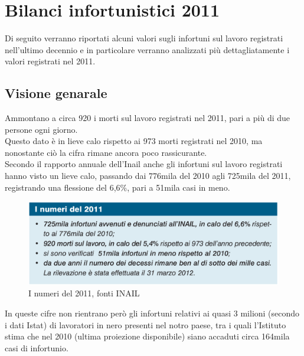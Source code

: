 
\section{Bilanci infortunistici 2011}
Di seguito verranno riportati alcuni valori sugli infortuni sul lavoro registrati nell'ultimo decennio e in particolare verranno analizzati più dettagliatamente i valori registrati nel 2011.

\subsection{Visione genarale}


Ammontano a circa 920 i morti sul lavoro registrati nel 2011, pari a più di due persone ogni giorno.\\
Questo dato è in lieve calo rispetto ai 973 morti registrati nel 2010, ma nonostante ciò la cifra rimane ancora poco rassicurante.\\
Secondo il rapporto annuale dell'Inail anche gli infortuni sul lavoro registrati hanno visto un lieve calo, passando dai 776mila del 2010 agli 725mila del 2011, registrando una flessione del 6,6\%, pari a 51mila casi in meno.\\

\begin{figure}[H]
\centering
\includegraphics[scale=0.3]{images/cap4/analisiDiMercato/infortuniGenerale}
\caption{I numeri del 2011, fonti INAIL}
\end{figure}


In queste cifre non rientrano però gli infortuni relativi ai quasi 3 milioni (secondo i dati Istat) di lavoratori in nero presenti nel notro paese, tra i quali l’Istituto stima che nel 2010 (ultima proiezione disponibile) siano accaduti circa 164mila casi di infortunio.\\

